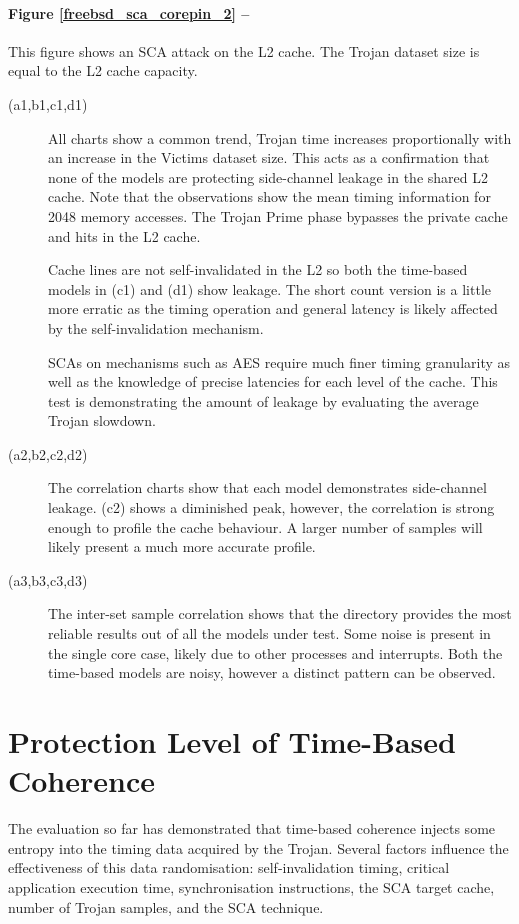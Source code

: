 			
		\paragraph{Figure \ref{freebsd_sca_corepin_2} --}
			This figure shows an SCA attack on the L2 cache. The Trojan dataset size is equal to the L2 cache capacity.
			\begin{description}
			\item [(a1,b1,c1,d1)] 
				All charts show a common trend, Trojan time increases proportionally with an increase in the Victims dataset size. This acts as a confirmation that none of the models are protecting side-channel leakage in the shared L2 cache. Note that the observations show the mean timing information for 2048 memory accesses. The Trojan Prime phase bypasses the private cache and hits in the L2 cache. 
				
				Cache lines are not self-invalidated in the L2 so both the time-based models in (c1) and (d1) show leakage. The short count version is a little more erratic as the timing operation and general latency is likely affected by the self-invalidation mechanism. 
				
				SCAs on mechanisms such as AES require much finer timing granularity as well as the knowledge of precise latencies for each level of the cache. This test is demonstrating the amount of leakage by evaluating the average Trojan slowdown.
			\item [(a2,b2,c2,d2)] 
				The correlation charts show that each model demonstrates side-channel leakage. (c2) shows a diminished peak, however, the correlation is strong enough to profile the cache behaviour. A larger number of samples will likely present a much more accurate profile.
			\item [(a3,b3,c3,d3)] 
				The inter-set sample correlation shows that the directory provides the most reliable results out of all the models under test. Some noise is present in the single core case, likely due to other processes and interrupts. Both the time-based models are noisy, however a distinct pattern can be observed. 
			\end{description}



\clearpage
\section{Protection Level of Time-Based Coherence}
	The evaluation so far has demonstrated that time-based coherence injects some entropy into the timing data acquired by the Trojan. Several factors influence the effectiveness of this data randomisation: self-invalidation timing, critical application execution time, synchronisation instructions, the SCA target cache, number of Trojan samples, and the SCA technique.
	

